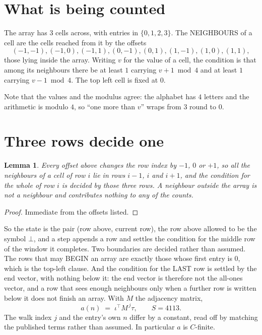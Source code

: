 \documentclass[11pt,a4paper]{article}
\theoremstyle{plain}
\newtheorem{lemma}[theorem]{Lemma}
\theoremstyle{definition}
\begin{document}
\section{What is being counted}

The array has $3$ cells across, with entries in $\{0,1,2,3\}$. The NEIGHBOURS of a cell are the
cells reached from it by the offsets
\[
(-1,-1), (-1,0), (-1,1), (0,-1), (0,1), (1,-1), (1,0), (1,1),
\]
those lying inside the array. Writing $v$ for the value of a cell, the condition is that among
its neighbours there be at least $1$ carrying $v+1 \bmod 4$ and at least $1$ carrying $v-1 \bmod 4$. The top left
cell is fixed at $0$.

Note that the values and the modulus agree: the alphabet has $4$ letters and the arithmetic
is modulo $4$, so ``one more than $v$'' wraps from $3$ round to $0$.

\section{Three rows decide one}

\begin{lemma}\label{lem:win}
Every offset above changes the row index by $-1$, $0$ or $+1$, so all the neighbours of a cell
of row $i$ lie in rows $i-1$, $i$ and $i+1$, and the condition for the whole of row $i$ is
decided by those three rows. A neighbour outside the array is not a neighbour and contributes
nothing to any of the counts.
\end{lemma}

\begin{proof}
Immediate from the offsets listed.
\end{proof}

So the state is the pair (row above, current row), the row above allowed to be the symbol
$\bot$, and a step appends a row and settles the condition for the middle row of the window it
completes. Two boundaries are decided rather than assumed. The rows that may BEGIN an array are
exactly those whose first entry is $0$, which is the top-left clause. And the condition for the
LAST row is settled by the end vector, with nothing below it: the end vector is therefore not
the all-ones vector, and a row that sees enough neighbours only when a further row is written
below it does not finish an array. With $M$ the adjacency matrix,
\[
a(n)\;=\;\iota^{\!\top}M^{\,j}\tau ,\qquad S=4113.
\]
The walk index $j$ and the entry's own $n$ differ by a constant, read off by matching the
published terms rather than assumed. In particular $a$ is $C$-finite.
\end{document}
